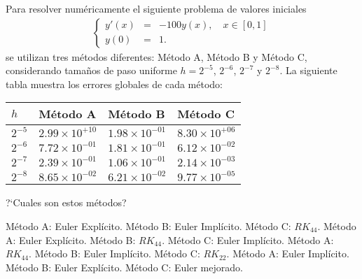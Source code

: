 \begin{pregunta}
\begin{cuerpo}
Para resolver num\'ericamente el siguiente problema de valores iniciales
\begin{eqnarray*}
\left \{
\begin{array}{rcl}
y'(x)&=& -100y(x), \quad  x \in [0,1]\\
y(0)&=&1.
\end{array}
\right.
\end{eqnarray*}
se utilizan tres m\'etodos diferentes: M\'etodo A, M\'etodo B y M\'etodo C, considerando tama\~nos de paso uniforme $h=2^{-5}$, $2^{-6}$, $2^{-7}$ y $2^{-8}$. La siguiente tabla muestra los errores globales de cada m\'etodo:

\begin{center}
\begin{tabular}{l||l|l|l}
$h$ & M\'etodo A & M\'etodo B & M\'etodo C  \\
\hline \hline
$2^{-5}$ & $2.99 \times 10^{+10}$  & $1.98 \times 10^{-01}$&$8.30 \times 10^{+06}$  \\
$2^{-6}$ & $7.72 \times 10^{-01}$ & $1.81 \times 10^{-01}$&$6.12 \times 10^{-02}$    \\
$2^{-7}$ & $2.39 \times 10^{-01}$ & $1.06 \times 10^{-01}$&$2.14 \times 10^{-03}$    \\
$2^{-8}$ & $8.65 \times 10^{-02}$ & $6.21 \times 10^{-02}$&$9.77 \times 10^{-05}$     
\end{tabular}
\end{center}
?`Cuales son estos m\'etodos?
\end{cuerpo}

\begin{alternativas}
{M\'etodo A: Euler Expl\'icito. M\'etodo B: Euler Impl\'icito. M\'etodo C: $RK_{44}$.} %
{M\'etodo A: Euler Expl\'icito. M\'etodo B: $RK_{44}$. M\'etodo C: Euler Impl\'icito.} 
{M\'etodo A: $RK_{44}$. M\'etodo B: Euler Impl\'icito. M\'etodo C: $RK_{22}$.}
{M\'etodo A: Euler Impl\'icito. M\'etodo B: Euler Expl\'icito. M\'etodo C: Euler mejorado.}
\end{alternativas}
\justificacion{7cm}
\end{pregunta}